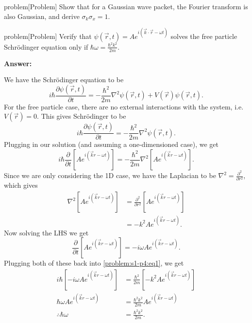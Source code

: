 \documentclass{article}
\begin{document}
\begin{callout}{problem}[Problem]
\label{problem:s1-p3}
Show that for a Gaussian wave packet, the Fourier transform is also Gaussian, and derive $\sigma _k\sigma _x=1$.
\end{callout}
\begin{callout}{problem}[Problem]
\label{problem:s1-p4}
Verify that $\psi (\vec{r},t)=Ae^{i(\vec{k}\cdot \vec{r}-\omega t)}$ solves the free particle Schr\"odinger equation only if $\hbar\omega =\frac{\hbar^2k^2}{2m}$.

\noindent\textbf{Answer:}

We have the Schr\"odinger equation to be
\[
    i \hbar \frac{\partial \psi (\vec{r},t)}{\partial t}=-\frac{\hbar^2}{2m}\nabla^2\psi (\vec{r},t)+V(\vec{r})\psi (\vec{r},t).
\]
For the free particle case, there are no external interactions with the system, i.e. $V(\vec{r})=0$. This gives Schr\"odinger to be
\[
    i \hbar \frac{\partial \psi (\vec{r},t)}{\partial t}=- \frac{\hbar^2}{2m}\nabla^2\psi (\vec{r},t).
\]
Plugging in our solution (and assuming a one-dimensioned case), we get
\begin{equation}
    i \hbar \frac{\partial }{\partial t}\left[ Ae^{i(\vec{k}r-\omega t)} \right]=- \frac{\hbar^2}{2m}\nabla^2 \left[ Ae^{i(\vec{k}r-\omega t)} \right]. \label{problem:s1-p4:eq1}
\end{equation}
Since we are only considering the 1D case, we have the Laplacian to be $\nabla^2=\frac{\partial^2}{\partial r^2}$, which gives
\begin{align*}
    \nabla^2 \left[ Ae^{i(\vec{k}r-\omega t)} \right] &= \frac{\partial^2}{\partial r^2} \left[ Ae^{i(\vec{k}r-\omega t)} \right] \\
                                                      &= -k^2Ae^{i(\vec{k}r-\omega t)} .
\end{align*}
Now solving the LHS we get
\[
    \frac{\partial }{\partial t}\left[ Ae^{i(\vec{k}r-\omega t)} \right]=-i\omega Ae^{i(\vec{k}r-\omega t)}.
\]
Plugging both of these back into \ref{problem:s1-p4:eq1}, we get
\begin{align*}
    i \hbar \left[ -i\omega Ae^{i(\vec{k}r-\omega t)} \right] &= \frac{\hbar^2 }{2m}\left[ -k^2Ae^{i(\vec{k}r-\omega t)} \right] \\
    \hbar\omega Ae^{i(\vec{k}r-\omega t)}&= \frac{\hbar^2k^2}{2m}Ae^{i(\vec{k}r-\omega t)} \\
    \therefore\hbar\omega &= \frac{\hbar^2k^2}{2m}.
\end{align*}
\end{callout}
\end{document}
